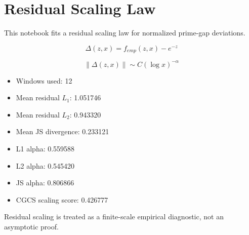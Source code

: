 \section*{Residual Scaling Law}

This notebook fits a residual scaling law for normalized prime-gap deviations.

\[
\Delta(z,x)=f_{emp}(z,x)-e^{-z}
\]

\[
\|\Delta(z,x)\|\sim C(\log x)^{-\alpha}
\]

\begin{itemize}
  \item Windows used: 12
  \item Mean residual $L_1$: 1.051746
  \item Mean residual $L_2$: 0.943320
  \item Mean JS divergence: 0.233121
  \item L1 alpha: 0.559588
  \item L2 alpha: 0.545420
  \item JS alpha: 0.806866
  \item CGCS scaling score: 0.426777
\end{itemize}

Residual scaling is treated as a finite-scale empirical diagnostic, not an asymptotic proof.
